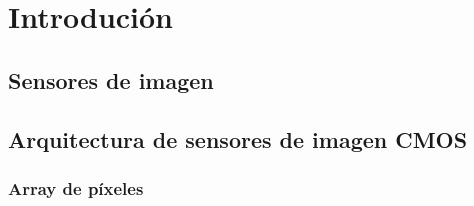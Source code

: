 \chapter{Introdución}\label{cap:intro}

\section{Sensores de imagen}\label{cap:image_sensors}

\section{Arquitectura de sensores de imagen CMOS}

\subsection{Array de píxeles}\label{cap:pxa_array}
